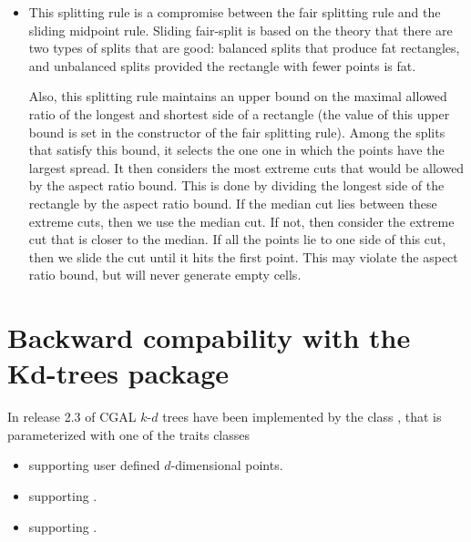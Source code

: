 \begin{itemize}
\item {}

This splitting rule is a compromise between the fair splitting rule
and the sliding midpoint rule.  Sliding fair-split is based on the
theory that there are two types of splits that are good: balanced
splits that produce fat rectangles, and unbalanced splits provided the
rectangle with fewer points is fat.

Also, this splitting rule maintains an upper bound on the maximal
allowed ratio of the longest and shortest side of a rectangle (the
value of this upper bound is set in the constructor of the fair
splitting rule). Among the splits that satisfy this bound, it selects
the one one in which the points have the largest spread.  It then
considers the most extreme cuts that would be allowed by the aspect
ratio bound. This is done by dividing the longest side of the
rectangle by the aspect ratio bound. If the median cut lies between
these extreme cuts, then we use the median cut. If not, then consider
the extreme cut that is closer to the median.  If all the points lie
to one side of this cut, then we slide the cut until it hits the first
point.  This may violate the aspect ratio bound, but will never
generate empty cells.

\end{itemize}



\section{Backward compability with the Kd-trees package}
\label{Spatial_searching:Backward_compability_Kd-trees}

In release 2.3 of CGAL
$k$-$d$ trees have been implemented by the class , 
that is parameterized with one of the
traits classes 

\begin{itemize}

\item
{} supporting user defined $d$-dimensional points.

\item 
{} supporting . 

\item
{} supporting . 

\end{itemize}

